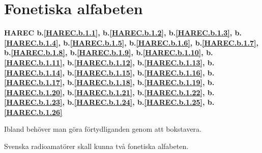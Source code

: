 \section{Fonetiska alfabeten}
\textbf{
HAREC b.\ref{HAREC.b.1.1}\label{myHAREC.b.1.1},
 b.\ref{HAREC.b.1.2}\label{myHAREC.b.1.2},
 b.\ref{HAREC.b.1.3}\label{myHAREC.b.1.3},
 b.\ref{HAREC.b.1.4}\label{myHAREC.b.1.4},
 b.\ref{HAREC.b.1.5}\label{myHAREC.b.1.5},
 b.\ref{HAREC.b.1.6}\label{myHAREC.b.1.6},
 b.\ref{HAREC.b.1.7}\label{myHAREC.b.1.7},
 b.\ref{HAREC.b.1.8}\label{myHAREC.b.1.8},
 b.\ref{HAREC.b.1.9}\label{myHAREC.b.1.9},
 b.\ref{HAREC.b.1.10}\label{myHAREC.b.1.10},
 b.\ref{HAREC.b.1.11}\label{myHAREC.b.1.11},
 b.\ref{HAREC.b.1.12}\label{myHAREC.b.1.12},
 b.\ref{HAREC.b.1.13}\label{myHAREC.b.1.13},
 b.\ref{HAREC.b.1.14}\label{myHAREC.b.1.14},
 b.\ref{HAREC.b.1.15}\label{myHAREC.b.1.15},
 b.\ref{HAREC.b.1.16}\label{myHAREC.b.1.16},
 b.\ref{HAREC.b.1.17}\label{myHAREC.b.1.17},
 b.\ref{HAREC.b.1.18}\label{myHAREC.b.1.18},
 b.\ref{HAREC.b.1.19}\label{myHAREC.b.1.19},
 b.\ref{HAREC.b.1.20}\label{myHAREC.b.1.20},
 b.\ref{HAREC.b.1.21}\label{myHAREC.b.1.21},
 b.\ref{HAREC.b.1.22}\label{myHAREC.b.1.22},
 b.\ref{HAREC.b.1.23}\label{myHAREC.b.1.23},
 b.\ref{HAREC.b.1.24}\label{myHAREC.b.1.24},
 b.\ref{HAREC.b.1.25}\label{myHAREC.b.1.25},
 b.\ref{HAREC.b.1.26}\label{myHAREC.b.1.26}
}

Ibland behöver man göra förtydliganden genom att bokstavera.

Svenska radioamatörer skall kunna två fonetiska alfabeten.



